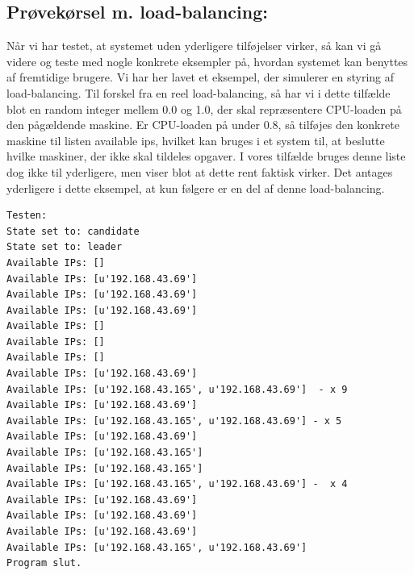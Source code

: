 \documentclass[a4paper,12pt]{article}
\begin{document}
\subsection{Prøvekørsel m. load-balancing:}
Når vi har testet, at systemet uden yderligere tilføjelser virker, så kan vi gå videre og teste med nogle konkrete eksempler på, hvordan systemet kan benyttes af fremtidige brugere.
Vi har her lavet et eksempel, der simulerer en styring af load-balancing. 
Til forskel fra en reel load-balancing, så har vi i dette tilfælde blot en random integer mellem 0.0 og 1.0, der skal repræsentere CPU-loaden på den pågældende maskine.
Er CPU-loaden på under 0.8, så tilføjes den konkrete maskine til listen available ips, hvilket kan bruges i et system til, at beslutte hvilke maskiner, der ikke skal tildeles opgaver.
I vores tilfælde bruges denne liste dog ikke til yderligere, men viser blot at dette rent faktisk virker.
Det antages yderligere i dette eksempel, at kun følgere er en del af denne load-balancing.
\begin{lstlisting}
Testen:
State set to: candidate
State set to: leader
Available IPs: []
Available IPs: [u'192.168.43.69']
Available IPs: [u'192.168.43.69']
Available IPs: [u'192.168.43.69']
Available IPs: []
Available IPs: []
Available IPs: []
Available IPs: [u'192.168.43.69']
Available IPs: [u'192.168.43.165', u'192.168.43.69']  - x 9
Available IPs: [u'192.168.43.69']
Available IPs: [u'192.168.43.165', u'192.168.43.69'] - x 5
Available IPs: [u'192.168.43.69']
Available IPs: [u'192.168.43.165']
Available IPs: [u'192.168.43.165']
Available IPs: [u'192.168.43.165', u'192.168.43.69'] -  x 4
Available IPs: [u'192.168.43.69']
Available IPs: [u'192.168.43.69']
Available IPs: [u'192.168.43.69']
Available IPs: [u'192.168.43.165', u'192.168.43.69']
Program slut.
\end{lstlisting}
\end{document}
